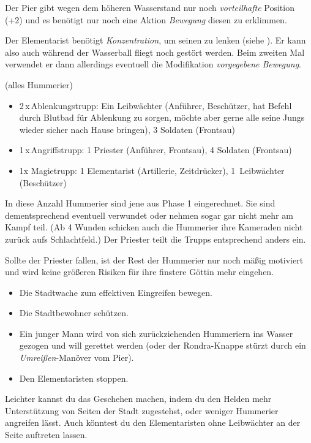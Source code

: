 Der Pier gibt wegen dem höheren Wasserstand nur noch \textit{vorteilhafte} Position (+2) und es benötigt nur noch eine Aktion \textit{Bewegung} diesen zu erklimmen.

Der Elementarist benötigt \textit{Konzentration}, um seinen  zu lenken (siehe ).
Er kann also auch während der Wasserball fliegt noch gestört werden.
Beim zweiten Mal verwendet er dann allerdings eventuell die Modifikation \textit{vorgegebene Bewegung}.

 (alles Hummerier)
\begin{itemize}
\item 2\,x\,Ablenkungstrupp: Ein Leibwächter (Anführer, Beschützer, hat Befehl durch Blutbad für Ablenkung zu sorgen, möchte aber gerne alle seine Jungs wieder sicher nach Hause bringen), 3 Soldaten (Frontsau)
\item 1\,x\,Angriffstrupp: 1 Priester (Anführer, Frontsau), 4 Soldaten (Frontsau)
\item 1x Magietrupp: 1 Elementarist (Artillerie, Zeitdrücker), 1~Leibwächter (Beschützer)
\end{itemize}

In diese Anzahl Hummerier sind jene aus Phase 1 eingerechnet. Sie sind dementsprechend eventuell verwundet oder nehmen sogar gar nicht mehr am Kampf teil. (Ab 4 Wunden schicken auch die Hummerier ihre Kameraden nicht zurück aufs Schlachtfeld.) Der Priester teilt die Trupps entsprechend anders ein.

Sollte der Priester fallen, ist der Rest der Hummerier nur noch mäßig motiviert und wird keine größeren Risiken für ihre finstere Göttin mehr eingehen.

\begin{itemize}
\item Die Stadtwache zum effektiven Eingreifen bewegen.
\item Die Stadtbewohner schützen.
\item Ein junger Mann wird von sich zurückziehenden Hummeriern ins Wasser gezogen und will gerettet werden (oder der Rondra-Knappe stürzt durch ein \textit{Umreißen}-Manöver vom Pier).
\item Den Elementaristen stoppen.
\end{itemize}

Leichter kannst du das Geschehen machen, indem du den Helden mehr Unterstützung von Seiten der Stadt zugestehst, oder weniger Hummerier angreifen lässt.
Auch könntest du den Elementaristen ohne Leibwächter an der Seite auftreten lassen. 

